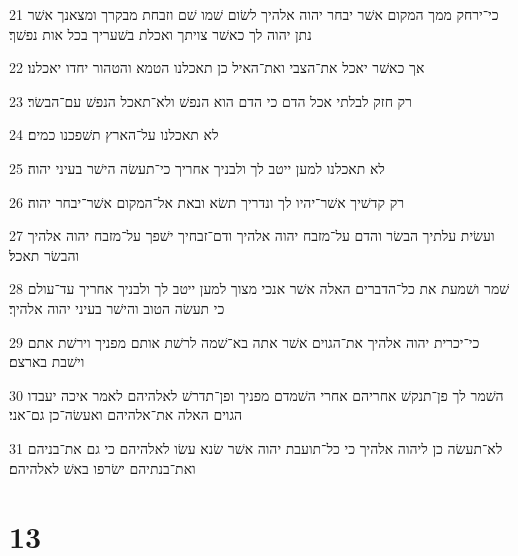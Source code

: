 \par 21 כי־ירחק ממך המקום אשׁר יבחר יהוה אלהיך לשׂום שׁמו שׁם וזבחת מבקרך ומצאנך אשׁר נתן יהוה לך כאשׁר צויתך ואכלת בשׁעריך בכל אות נפשׁך׃
\par 22 אך כאשׁר יאכל את־הצבי ואת־האיל כן תאכלנו הטמא והטהור יחדו יאכלנו׃
\par 23 רק חזק לבלתי אכל הדם כי הדם הוא הנפשׁ ולא־תאכל הנפשׁ עם־הבשׂר׃
\par 24 לא תאכלנו על־הארץ תשׁפכנו כמים׃
\par 25 לא תאכלנו למען ייטב לך ולבניך אחריך כי־תעשׂה הישׁר בעיני יהוה׃
\par 26 רק קדשׁיך אשׁר־יהיו לך ונדריך תשׂא ובאת אל־המקום אשׁר־יבחר יהוה׃
\par 27 ועשׂית עלתיך הבשׂר והדם על־מזבח יהוה אלהיך ודם־זבחיך ישׁפך על־מזבח יהוה אלהיך והבשׂר תאכל׃
\par 28 שׁמר ושׁמעת את כל־הדברים האלה אשׁר אנכי מצוך למען ייטב לך ולבניך אחריך עד־עולם כי תעשׂה הטוב והישׁר בעיני יהוה אלהיך׃
\par 29 כי־יכרית יהוה אלהיך את־הגוים אשׁר אתה בא־שׁמה לרשׁת אותם מפניך וירשׁת אתם וישׁבת בארצם׃
\par 30 השׁמר לך פן־תנקשׁ אחריהם אחרי השׁמדם מפניך ופן־תדרשׁ לאלהיהם לאמר איכה יעבדו הגוים האלה את־אלהיהם ואעשׂה־כן גם־אני׃
\par 31 לא־תעשׂה כן ליהוה אלהיך כי כל־תועבת יהוה אשׁר שׂנא עשׂו לאלהיהם כי גם את־בניהם ואת־בנתיהם ישׂרפו באשׁ לאלהיהם׃

\chapter{13}

